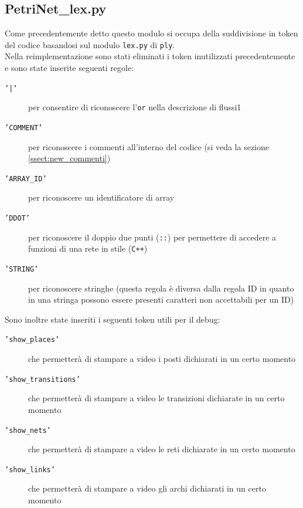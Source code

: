 \documentclass[italian,12pt]{book}
\begin{document}
\subsection{PetriNet\_lex.py}
Come precedentemente detto questo modulo si occupa della suddivisione in token del codice basandosi sul modulo {\tt lex.py} di {\tt ply}.\\
Nella reimplementazione sono stati eliminati i token inutilizzati precedentemente e sono state inserite seguenti regole:
\begin{description}

\item[{\tt '|'}] per consentire di riconoscere l'{\tt or} nella descrizione di flussi1

\item[{\tt 'COMMENT'}] per riconoscere i commenti all'interno del codice (si veda la sezione \ref{ssect:new_commenti})

\item[{\tt 'ARRAY\_ID'}] per riconoscere un identificatore di array

\item[{\tt 'DDOT'}] per riconoscere il doppio due punti ({\tt ::}) per permettere di accedere a funzioni di una rete in stile ({\tt C++})

\item[{\tt 'STRING'}] per riconoscere stringhe (questa regola è diversa dalla regola ID in quanto in una stringa possono essere presenti caratteri non accettabili per un ID)

\end{description}

Sono inoltre state inseriti i seguenti token utili per il debug:
\begin{description}

\item[{\tt 'show\_places'}] che permetterà di stampare a video i posti dichiarati in un certo momento

\item[{\tt 'show\_transitions'}] che permetterà di stampare a video le transizioni dichiarate in un certo momento

\item[{\tt 'show\_nets'}] che permetterà di stampare a video le reti dichiarate in un certo momento

\item[{\tt 'show\_links'}] che permetterà di stampare a video gli archi dichiarati in un certo momento

\end{description}
\end{document}
